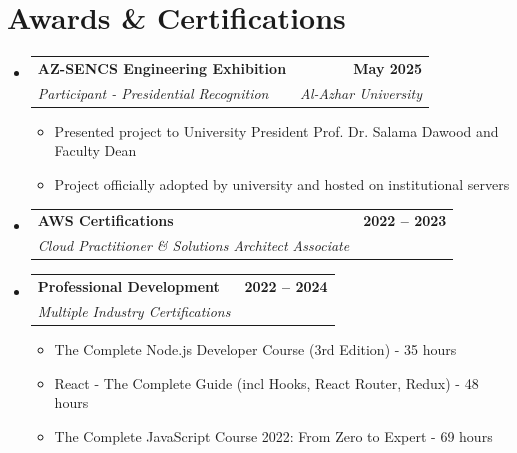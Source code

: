 \documentclass[letterpaper,11pt]{article}
\makeatletter
\newcommand{\resumeItem}[1]{
  \item\small{
    {#1 \vspace{-2pt}}
  }
}
\newcommand{\resumeSubheading}[4]{
  \vspace{-2pt}\item
    \begin{tabular*}{1.0\textwidth}[t]{l@{\extracolsep{\fill}}r}
      \textbf{#1} & \textbf{\small #2} \\
      \textit{\small#3} & \textit{\small #4} \\
    \end{tabular*}\vspace{-7pt}
}
\newcommand{\resumeSubHeadingListStart}{\begin{itemize}[leftmargin=0.0in, label={}]}
\newcommand{\resumeSubHeadingListEnd}{\end{itemize}}
\newcommand{\resumeItemListStart}{\begin{itemize}}
\newcommand{\resumeItemListEnd}{\end{itemize}\vspace{-5pt}}
\makeatother
\begin{document}
\section{Awards \& Certifications}
\resumeSubHeadingListStart
    \resumeSubheading{AZ-SENCS Engineering Exhibition}{May 2025}{Participant - Presidential Recognition}{Al-Azhar University}
        \resumeItemListStart
            \resumeItem{Presented project to University President Prof. Dr. Salama Dawood and Faculty Dean}
            \resumeItem{Project officially adopted by university and hosted on institutional servers}
        \resumeItemListEnd
        
    \resumeSubheading{AWS Certifications}{2022 -- 2023}{Cloud Practitioner \& Solutions Architect Associate}{}
    
    \resumeSubheading{Professional Development}{2022 -- 2024}{Multiple Industry Certifications}{}
        \resumeItemListStart
            \resumeItem{The Complete Node.js Developer Course (3rd Edition) - 35 hours}
            \resumeItem{React - The Complete Guide (incl Hooks, React Router, Redux) - 48 hours}
            \resumeItem{The Complete JavaScript Course 2022: From Zero to Expert - 69 hours}
        \resumeItemListEnd
\resumeSubHeadingListEnd
\end{document}
